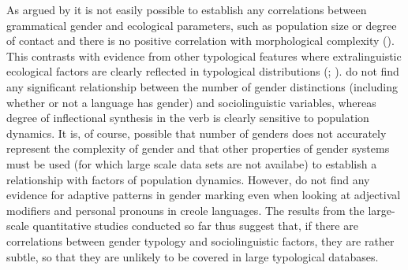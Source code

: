 \documentclass[output=collectionpaper]{langsci/langscibook}
\begin{document}
As argued by  it is not easily possible to establish any correlations between grammatical gender and ecological parameters, such as population size or degree of contact and there is no positive correlation with morphological complexity (). This contrasts with evidence from other typological features where extralinguistic ecological factors are clearly reflected in typological distributions (\citealt{Lupyan2010}; \citealt{Sinnemaeki2014b}). \cite{Sinnemaeki2018} do not find any significant relationship between the number of gender distinctions (including whether or not a language has gender) and sociolinguistic variables, whereas degree of inflectional synthesis in the verb is clearly sensitive to population dynamics. It is, of course, possible that number of genders does not accurately represent the complexity of gender and that other properties of gender systems must be used (for which large scale data sets are not availabe) to establish a relationship with factors of population dynamics. However, \cite{Blasi2017} do not find any evidence for adaptive patterns in gender marking even when looking at adjectival modifiers and personal pronouns in creole languages. The results from the large-scale quantitative studies conducted so far thus suggest that, if there are correlations between gender typology and sociolinguistic factors, they are rather subtle, so that they are unlikely to be covered in large typological databases.
\end{document}
